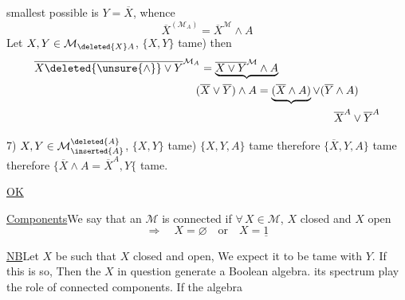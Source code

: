 smallest possible is $Y=\overline X$, whence 
\[
\overline X^{(\mathcal M_A)}=\overline X^{\mathcal M}\wedge A
\]
Let $X,Y\in \mathcal M_{\deleted{X}A}$, $\{X,Y\}$ tame) then
\[
\begin{aligned}
\overline{X\deleted{\unsure{\wedge}}\vee Y}^{\mathcal M_A}
   &=\underbrace{\overline{X\vee Y}^{\mathcal M}\wedge A}\\
   &\hspace{-.4em}(\overline X\vee\overline Y)\wedge A
       =\underbrace{(\overline X\wedge A)}\vee(\overline Y\wedge A)\\
   &\hspace{12em}\overline X^A\vee\overline Y^A
\end{aligned}
\]

7) $X,Y\in \mathcal M_{\inserted{A}}^{\deleted{A}}$, $\{X,Y\}$ tame)   $\{X,Y,A\}$ tame therefore $\{\overline X,Y,A\}$ tame therefore $\{\overline X\wedge A=\overline X^A,Y\{$ tame.

\uline{OK}

\uline{Components}\qquad We say that an $\mathcal M$ is connected if  $\forall\,X\in \mathcal M$, $X$ closed and $X$ open
\[
\Longrightarrow\quad X=\varnothing\quad\text{or}\quad X=\underline{1}
\]

\uline{NB}\qquad Let $X$ be such that $X$ closed and open, We expect it to be tame with  $Y$. If this is so, Then the $X$ in question generate a Boolean algebra.    its spectrum play the role of connected components. If the algebra
